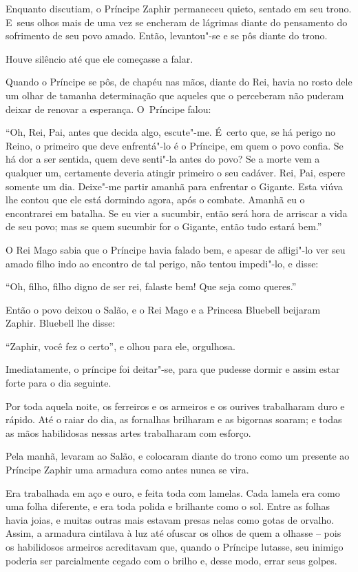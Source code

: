 Enquanto discutiam, o Príncipe Zaphir permaneceu quieto, sentado em seu
trono. E~seus olhos mais de uma vez se encheram de lágrimas diante do
pensamento do sofrimento de seu povo amado. Então, levantou"-se e se pôs
diante do trono.

Houve silêncio até que ele começasse a falar.

Quando o Príncipe se pôs, de chapéu nas mãos, diante do Rei, havia no
rosto dele um olhar de tamanha determinação que aqueles que o
perceberam não puderam deixar de renovar a esperança. O~Príncipe
falou:

``Oh, Rei, Pai, antes que decida algo, escute"-me. É~certo que, se há
perigo no Reino, o primeiro que deve enfrentá"-lo é o Príncipe, em quem o
povo confia. Se há dor a ser sentida, quem deve senti"-la antes do povo? Se
a morte vem a qualquer um, certamente deveria atingir primeiro o seu
cadáver. Rei, Pai, espere somente um dia. Deixe"-me partir amanhã para
enfrentar o Gigante. Esta viúva lhe contou que ele está dormindo agora,
após o combate. Amanhã eu o encontrarei em batalha. Se eu vier a sucumbir,
então será hora de arriscar a vida de seu povo; mas se quem
sucumbir for o Gigante, então tudo estará bem.''

O Rei Mago sabia que o Príncipe havia falado bem, e apesar de afligi"-lo
ver seu amado filho indo ao encontro de tal perigo, não tentou
impedi"-lo, e disse:



``Oh, filho, filho digno de ser rei, falaste bem! Que seja como
queres.''

Então o povo deixou o Salão, e o Rei Mago e a Princesa Bluebell beijaram
Zaphir. Bluebell lhe disse:

``Zaphir, você fez o certo'', e olhou para ele, orgulhosa.

Imediatamente, o príncipe foi deitar"-se, para que pudesse dormir e assim
estar forte para o dia seguinte.

Por toda aquela noite, os ferreiros e os armeiros e os ourives
trabalharam duro e rápido. Até o raiar do dia, as fornalhas brilharam e
as bigornas soaram; e todas as mãos habilidosas nessas artes trabalharam
com esforço.

Pela manhã, levaram ao Salão, e colocaram diante do trono como um
presente ao Príncipe Zaphir uma armadura como antes nunca se vira.

Era trabalhada em aço e ouro, e feita toda com lamelas. Cada lamela era
como uma folha diferente, e era toda polida e brilhante como o sol.
Entre as folhas havia joias, e muitas outras mais estavam presas nelas
como gotas de orvalho. Assim, a armadura cintilava à luz até ofuscar os
olhos de quem a olhasse -- pois os habilidosos armeiros acreditavam que,
quando o Príncipe lutasse, seu inimigo poderia ser parcialmente cegado
com o brilho e, desse modo, errar seus golpes.


